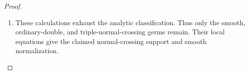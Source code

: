 \begin{proof}
\begin{enumerate}[label={$\langle1\rangle$\arabic*.},leftmargin=*]
\item These calculations exhaust the analytic
classification. Thus only the smooth,
ordinary-double, and triple-normal-crossing
germs remain. Their local equations give
the claimed normal-crossing support and
smooth normalization.

\end{enumerate}
\end{proof}
